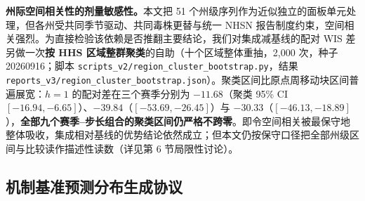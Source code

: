 \documentclass[10pt,a4paper]{article}
\theoremstyle{plain}
\theoremstyle{definition}
\begin{document}
\noindent\textbf{州际空间相关性的剂量敏感性。}本文把 51 个州级序列作为近似独立的面板单元处理，但各州受共同季节驱动、共同毒株更替与统一 NHSN 报告制度约束，空间相关强烈。为直接检验该依赖是否推翻主要结论，我们对集成减基线的配对 WIS 差另做一次\textbf{按 HHS 区域整群聚类}的自助（十个区域整体重抽，2,000 次，种子 20260916；脚本 \texttt{scripts\_v2/region\_cluster\_bootstrap.py}，结果 \texttt{reports\_v3/region\_cluster\_bootstrap.json}）。聚类区间比原点周移动块区间普遍展宽：$h=1$ 的配对差在三个赛季分别为 $-11.68$（聚类 95\% CI $[-16.94, -6.65]$）、$-39.84$（$[-53.69, -26.45]$）与 $-30.33$（$[-46.13, -18.89]$），\textbf{全部九个赛季--步长组合的聚类区间仍严格不跨零}。即令空间相关被最保守地整体吸收，集成相对基线的优势结论依然成立；但本文仍按保守口径把全部州级区间与比较读作描述性读数（详见第 6 节局限性讨论）。

\subsection{机制基准预测分布生成协议}\label{sec:mech_predictor_protocol}
\end{document}
